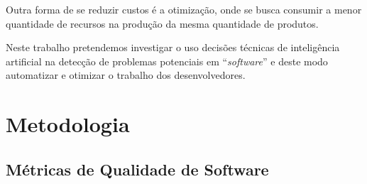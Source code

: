 \documentclass[10pt]{article}
\begin{document}
        Outra forma de se reduzir custos é a otimização, onde se busca consumir a menor quantidade de recursos na produção da mesma quantidade de produtos.

        Neste trabalho pretendemos investigar o uso decisões técnicas de inteligência artificial na detecção de problemas potenciais em ``\textit{software}'' e deste modo automatizar e otimizar o trabalho dos desenvolvedores.

        
\section{Metodologia}

    \subsection{Métricas de Qualidade de Software}


\end{document}
